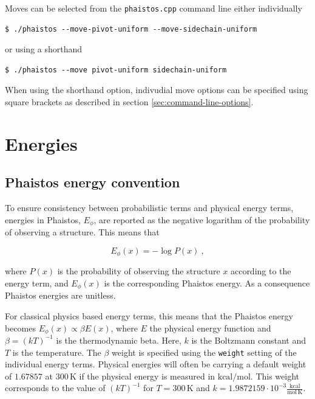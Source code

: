 \documentclass[11pt,a4paper,twoside]{book}
\begin{document}
Moves can be selected from the \texttt{phaistos.cpp} command line
either individually

\begin{verbatim}
$ ./phaistos --move-pivot-uniform --move-sidechain-uniform
\end{verbatim}

\noindent
or using a shorthand

\begin{verbatim}
$ ./phaistos --move pivot-uniform sidechain-uniform
\end{verbatim}

\noindent
When using the shorthand option, indivudial move options can be
specified using square brackets as described in section
\ref{sec:command-line-options}.



\chapter{Energies}
\label{sec:energies}

\section{Phaistos energy convention}
\label{sec:energy_convention}

To ensure consistency between probabilistic terms and physical energy
terms, energies in Phaistos, $E_{\phi}$, are reported as the negative
logarithm of the probability of observing a structure. This means that

\begin{equation}
E_{\phi}(x) = -\log P(x) \ ,
\end{equation}

\noindent where $P(x)$ is the probability of observing the structure
$x$ according to the energy term, and $E_{\phi}(x)$ is the
corresponding Phaistos energy. As a consequence Phaistos energies are
unitless.

For classical physics based energy terms, this means that the Phaistos
energy becomes $E_{\phi}(x) \propto \beta {E(x)}$, where $E$ the physical
energy function and $\beta = (kT)^{-1}$ is the thermodynamic
beta. Here, $k$ is the Boltzmann constant and $T$ is the
temperature. The $\beta$ weight is specified using the \texttt{weight}
setting of the individual energy terms. Physical energies will often
be carrying a default weight of $1.67857$ at $300\,\mathrm{K}$ if the
physical energy is measured in $\mathrm{kcal}/\mathrm{mol}$. This
weight corresponds to the value of $(kT)^{-1}$ for $T=300\,\mathrm{K}$
and $k = 1.9872159 \cdot 10^{-3}
\frac{\mathrm{kcal}}{\mathrm{mol}\,\mathrm{K}}$.
\end{document}
